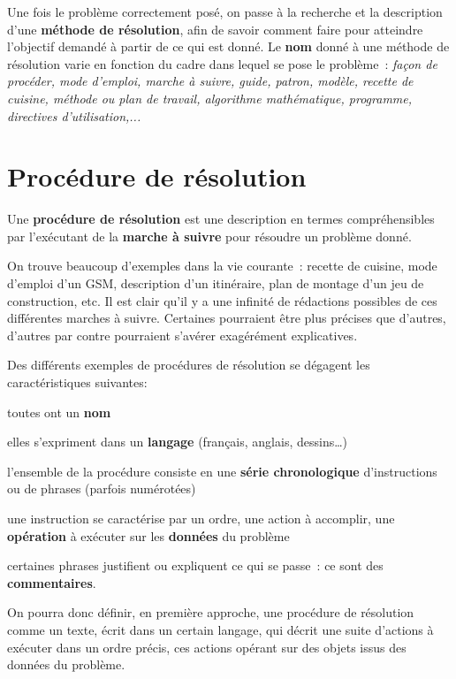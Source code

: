 		Une fois le problème correctement posé, on passe à la recherche et la
		description d’une \textbf{méthode de résolution}, afin de savoir
		comment faire pour atteindre l’objectif demandé à partir de ce qui est
		donné. Le \textbf{nom} donné à une méthode de résolution varie en
		fonction du cadre dans lequel se pose le problème~: \textit{façon de
		procéder, mode d’emploi, marche à suivre, guide, patron, modèle,
		recette de cuisine, méthode ou plan de travail, algorithme
		mathématique, programme, directives d’utilisation,...}

\section{Procédure de résolution}

	Une \textbf{procédure de résolution }est une description en termes
	compréhensibles par l'exécutant de la \textbf{marche à
	suivre} pour résoudre un problème donné.
	
	On trouve beaucoup d'exemples dans la vie courante~:
	recette de cuisine, mode d’emploi d’un GSM, description d’un
	itinéraire, plan de montage d’un jeu de construction, etc. Il est clair
	qu’il y a une infinité de rédactions possibles de ces différentes
	marches à suivre. Certaines pourraient être plus précises que d’autres,
	d’autres par contre pourraient s’avérer exagérément explicatives.
	
	Des différents exemples de procédures de résolution se dégagent les
	caractéristiques suivantes:

	\begin{liste}
	\item toutes ont un \textbf{nom}
	\item elles s’expriment dans un \textbf{langage}
		(français, anglais, dessins\dots)
	\item l’ensemble de la procédure consiste 
		en une \textbf{série chronologique}
		d’instructions ou de phrases (parfois numérotées)
	\item une instruction se caractérise par un ordre, 
		une action à accomplir,
		une \textbf{opération} à exécuter sur les \textbf{données} du problème
	\item certaines phrases justifient ou expliquent ce qui se passe~: 
		ce sont des \textbf{commentaires}.
	\end{liste}

	On pourra donc définir, en première approche, une procédure de
	résolution comme un texte, écrit dans un certain langage, qui décrit
	une suite d’actions à exécuter dans un ordre précis, ces actions
	opérant sur des objets issus des données du problème.

